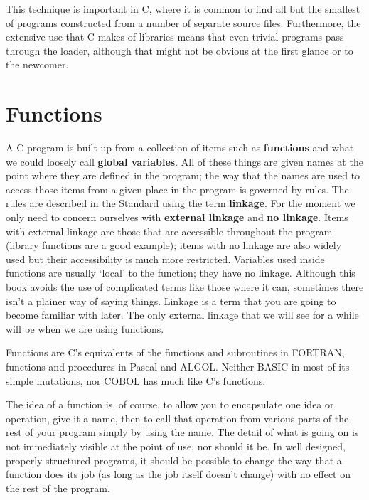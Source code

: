   This technique is important in C, where it is common to find all but the
   smallest of programs constructed from a number of separate source files.
   Furthermore, the extensive use that C makes of libraries means that even
   trivial programs pass through the loader, although that might not be obvious
   at the first glance or to the newcomer.


 
        \section{Functions}
        

  

  A C program is built up from a collection of items such as
   \textbf{functions} and what we could loosely call \textbf{global
   variables}. All of these things are given names at the point where they
   are defined in the program; the way that the names are used to access those
   items from a given place in the program is governed by rules. The rules are
   described in the Standard using the term \textbf{linkage}. For the moment
   we only need to concern ourselves with \textbf{external linkage} and
   \textbf{no linkage}. Items with external linkage are those that are
   accessible throughout the program (library functions are a good example);
   items with no linkage are also widely used but their accessibility is much
   more restricted. Variables used inside functions are usually `local'
   to the function; they have no linkage. Although this book avoids the use of
   complicated terms like those where it can, sometimes there isn't a plainer
   way of saying things. Linkage is a term that you are going to become
   familiar with later. The only external linkage that we will see for a while
   will be when we are using functions.


  Functions are C's equivalents of the functions and subroutines in FORTRAN,
   functions and procedures in Pascal and ALGOL. Neither BASIC in most of its
   simple mutations, nor COBOL has much like C's functions.


  The idea of a function is, of course, to allow you to encapsulate one idea
   or operation, give it a name, then to call that operation from various parts
   of the rest of your program simply by using the name. The detail of what is
   going on is not immediately visible at the point of use, nor should it
   be. In well designed, properly structured programs, it should be possible to
   change the way that a function does its job (as long as the job itself
   doesn't change) with no effect on the rest of the program.


